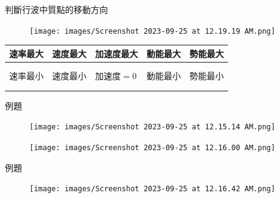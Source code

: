 \documentclass[13pt]{beamer}
\begin{document}
\begin{frame}{判斷行波中質點的移動方向}
    \begin{figure}
        \centering
        \texttt{[image: images/Screenshot 2023-09-25 at 12.19.19 AM.png]}


    \end{figure}
    \bigskip
    \begin{table}[]
        \begin{tabular}{l|l|l|l|l}
            速率最大 & 速度最大 & 加速度最大   & 動能最大 & 勢能最大 \\
            \hline
                 &      &         &      &      \\
                 &      &         &      &      \\
            \hline
            速率最小 & 速度最小 & 加速度$=0$ & 動能最小 & 勢能最小 \\
            \hline
                 &      &         &      &      \\
                 &      &         &      &      \\
        \end{tabular}
    \end{table}


\end{frame}

\begin{frame}{例題}
    \begin{figure}
        \centering
        \texttt{[image: images/Screenshot 2023-09-25 at 12.15.14 AM.png]}


    \end{figure}
    \begin{figure}
        \centering
        \texttt{[image: images/Screenshot 2023-09-25 at 12.16.00 AM.png]}


    \end{figure}
\end{frame}

\begin{frame}{例題}
    \begin{figure}
        \centering
        \texttt{[image: images/Screenshot 2023-09-25 at 12.16.42 AM.png]}


    \end{figure}
\end{frame}
\end{document}
